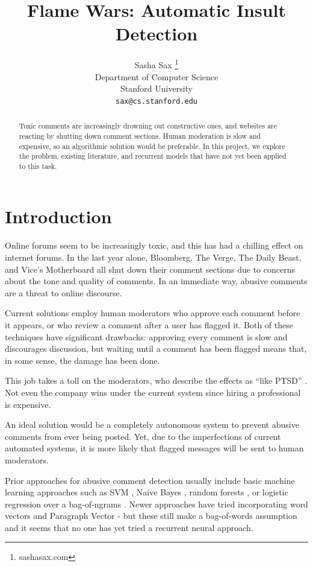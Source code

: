 \documentclass{article} %
\title{Flame Wars: Automatic Insult Detection}
\author{
Sasha Sax \thanks{ sashasax.com } \\
Department of Computer Science\\
Stanford University\\
\texttt{sax@cs.stanford.edu}
}
\begin{document}
\maketitle

\begin{abstract}
Toxic comments are increasingly drowning out constructive ones, and websites are reacting by shutting down comment sections. Human moderation is slow and expensive, so an algorithmic solution would be preferable. In this project, we explore the problem, existing literature, and recurrent models that have not yet been  applied to this task.
\end{abstract}

\section*{Introduction}
Online forums seem to be increasingly toxic, and this has had a chilling effect on internet forums. In the last year alone, Bloomberg, The Verge, The Daily Beast, and Vice's Motherboard all shut down their comment sections due to concerns about the tone and quality of comments. In an immediate way, abusive comments are a threat to online discourse.
				
Current solutions employ human moderators who approve each comment before it appears, or who review a comment after a user has flagged it. Both of these techniques have significant drawbacks: approving every comment is slow and discourages discussion, but waiting until a comment has been flagged means that, in some sense, the damage has been done. 

This job takes a toll on the moderators, who describe the effects as ``like PTSD'' \cite{wired-facebook}. Not even the company wins under the current system since hiring a professional is expensive.
					
An ideal solution would be a completely autonomous system to prevent abusive comments from ever being posted. Yet, due to the imperfections of current automated systems, it is more likely that flagged messages will be sent to human moderators. 

Prior approaches for abusive comment detection usually include basic machine learning approaches such as SVM \cite{warner2012detecting} \cite{ishisaka2010detecting}, Naive Bayes \cite{goyal2013peer} \cite{Razavi2010}, random forests \cite{goyal2013peer}, or logistic regression \cite{kaggle2012} over a bag-of-ngrams \cite{ishisaka2010detecting}. Newer approaches have tried incorporating word vectors and Paragraph Vector \cite{DBLP:conf/www/NobataTTMC16} \cite{Djuric:2015:HSD:2740908.2742760} - but these still make a bag-of-words assumption and it seems that no one has yet tried a recurrent neural approach. 
\end{document}
